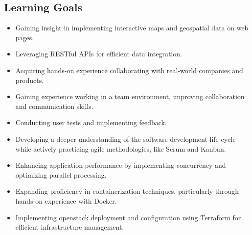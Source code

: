 \subsection{Learning Goals}\label{subsec:req:learninggoals}
\begin{itemize}
    \item Gaining insight in implementing interactive maps and geospatial data on web pages.
    \item Leveraging RESTful APIs for efficient data integration.
    \item Acquiring hands-on experience collaborating with real-world companies and products.
    \item Gaining experience working in a team environment, improving collaboration and communication skills.
    \item Conducting user tests and implementing feedback. 
    \item Developing a deeper understanding of the software development life cycle while actively practicing agile methodologies, like Scrum and Kanban.
    \item Enhancing application performance by implementing concurrency and optimizing parallel processing.
    \item Expanding proficiency in containerization techniques, particularly through hands-on experience with Docker.
    \item Implementing \Gls{openstack} deployment and configuration using Terraform for efficient infrastructure management.

\end{itemize}
